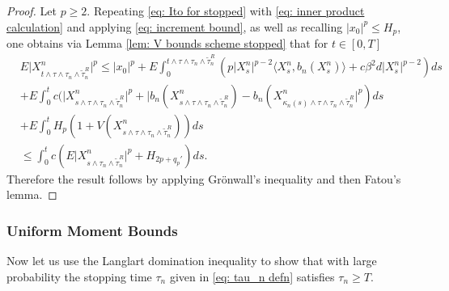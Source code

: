 \documentclass{article}
\begin{document}
\begin{proof}
    Let $p\geq 2$. Repeating \eqref{eq: Ito for stopped} with \eqref{eq: inner product calculation} and applying \eqref{eq: increment bound}, as well as recalling $\lvert x_0\rvert^p\leq H_p$, one obtains via Lemma \ref{lem: V bounds scheme stopped} that for $t\in [0,T]$
     \begin{align}
  &E\lvert X^n_{t \wedge\tau\wedge\tau_n \wedge \tilde{\tau}_n^R} \rvert^{p}\leq \lvert x_0\rvert^p+E\int^{t \wedge\tau\wedge\tau_n \wedge \tilde{\tau}_n^R}_0 (p\lvert X^n_s\rvert^{p-2}\langle X^n_s, b_n(X^n_{s})\rangle +c\beta^2 d\lvert X^n_s \rvert^{p-2})ds \nonumber \\
  &+E\int^t_0 c(\lvert X^n_{s\wedge\tau\wedge\tau_n \wedge \tilde{\tau}_n^R}\rvert^p+\lvert b_n(X^n_{s\wedge\tau\wedge\tau_n \wedge \tilde{\tau}_n^R})-b_n(X^n_{\kappa_n(s)\wedge\tau\wedge\tau_n \wedge \tilde{\tau}_n^R}\rvert^p)ds\nonumber \\
  &+E\int^t_0 H_p(1+V(X^n_{s\wedge\tau\wedge\tau_n \wedge \tilde{\tau}_n^R}))ds\nonumber \\
  &\leq \int^{t }_0 c(E\lvert X^n_{s \wedge\tau_n \wedge \tilde{\tau}_n^R}\rvert^p+H_{2p+q_p'})ds.
    \end{align}
    Therefore the result follows by applying Grönwall's inequality and then Fatou's lemma.
\end{proof}
\subsubsection{Uniform Moment Bounds}
Now let us use the Langlart domination inequality to show that with large probability the stopping time $\tau_n$ given in \eqref{eq: tau_n defn} satisfies $\tau_n\geq T$.
\end{document}
